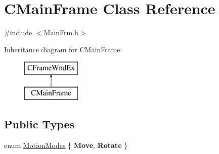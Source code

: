 \hypertarget{class_c_main_frame}{}\section{C\+Main\+Frame Class Reference}
\label{class_c_main_frame}


{\ttfamily \#include $<$Main\+Frm.\+h$>$}

Inheritance diagram for C\+Main\+Frame\+:\begin{figure}[H]
\begin{center}
\leavevmode
\includegraphics[height=2.000000cm]{class_c_main_frame}
\end{center}
\end{figure}
\subsection*{Public Types}
\begin{DoxyCompactItemize}
\item 
enum \hyperlink{class_c_main_frame_a89722c82d82f95a761772a8dd9755b7b}{Motion\+Modes} \{ {\bfseries Move}, 
{\bfseries Rotate}
 \}
\end{DoxyCompactItemize}
